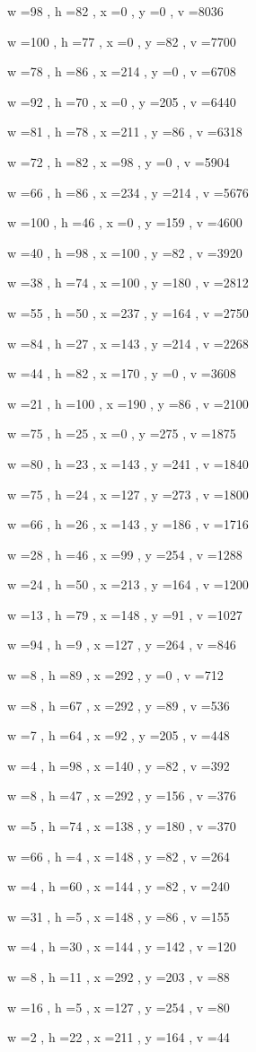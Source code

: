 \documentclass[11pt]{article}
\begin{document}
w =98 , h =82 , x =0 , y =0 , v =8036
\par
w =100 , h =77 , x =0 , y =82 , v =7700
\par
w =78 , h =86 , x =214 , y =0 , v =6708
\par
w =92 , h =70 , x =0 , y =205 , v =6440
\par
w =81 , h =78 , x =211 , y =86 , v =6318
\par
w =72 , h =82 , x =98 , y =0 , v =5904
\par
w =66 , h =86 , x =234 , y =214 , v =5676
\par
w =100 , h =46 , x =0 , y =159 , v =4600
\par
w =40 , h =98 , x =100 , y =82 , v =3920
\par
w =38 , h =74 , x =100 , y =180 , v =2812
\par
w =55 , h =50 , x =237 , y =164 , v =2750
\par
w =84 , h =27 , x =143 , y =214 , v =2268
\par
w =44 , h =82 , x =170 , y =0 , v =3608
\par
w =21 , h =100 , x =190 , y =86 , v =2100
\par
w =75 , h =25 , x =0 , y =275 , v =1875
\par
w =80 , h =23 , x =143 , y =241 , v =1840
\par
w =75 , h =24 , x =127 , y =273 , v =1800
\par
w =66 , h =26 , x =143 , y =186 , v =1716
\par
w =28 , h =46 , x =99 , y =254 , v =1288
\par
w =24 , h =50 , x =213 , y =164 , v =1200
\par
w =13 , h =79 , x =148 , y =91 , v =1027
\par
w =94 , h =9 , x =127 , y =264 , v =846
\par
w =8 , h =89 , x =292 , y =0 , v =712
\par
w =8 , h =67 , x =292 , y =89 , v =536
\par
w =7 , h =64 , x =92 , y =205 , v =448
\par
w =4 , h =98 , x =140 , y =82 , v =392
\par
w =8 , h =47 , x =292 , y =156 , v =376
\par
w =5 , h =74 , x =138 , y =180 , v =370
\par
w =66 , h =4 , x =148 , y =82 , v =264
\par
w =4 , h =60 , x =144 , y =82 , v =240
\par
w =31 , h =5 , x =148 , y =86 , v =155
\par
w =4 , h =30 , x =144 , y =142 , v =120
\par
w =8 , h =11 , x =292 , y =203 , v =88
\par
w =16 , h =5 , x =127 , y =254 , v =80
\par
w =2 , h =22 , x =211 , y =164 , v =44
\par
\newpage
\end{document}
